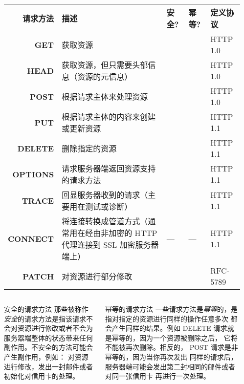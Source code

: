\documentclass[final,table]{beamer}
\newcommand{\yes}{\color{green!60!black}{yes}}
\newcommand{\no}{\color{red}{no}}
\newcommand{\method}[1]{\textbf{#1}}
\begin{document}
\begin{frame}{}
    \begin{columns}
      \begin{column}{0.05\textwidth}
      \end{column}
      \begin{column}{0.9\textwidth}
        \begin{block}{}
          \Huge
          \begin{tabular}{r p{} l l l}
            请求方法 & 描述 & 安全? & 幂等? & 定义协议\\ \hline
            \method{GET} & 获取资源 & \yes & \yes & HTTP 1.0 \\
            \method{HEAD} & 获取资源，但只需要头部信息（资源的元信息） & \yes & \yes &HTTP 1.0 \\
            \method{POST} & 根据请求主体来处理资源 & \no & \no & HTTP 1.0 \\
            \method{PUT} & 根据请求主体的内容来创建或更新资源 & \no & \yes & HTTP 1.1 \\
            \method{DELETE} & 删除指定的资源 & \yes & \yes & HTTP 1.1 \\
            \method{OPTIONS} & 请求服务器端返回资源支持的请求方法 & \yes & \yes & HTTP 1.1 \\
            \method{TRACE} & 回显服务器收到的请求（主要用在测试或诊断） & \yes & \yes & HTTP 1.1 \\
            \method{CONNECT} & 将连接转换成管道方式（通常用在经由非加密的 HTTP 代理连接到 SSL 加密服务器端上） & --- & --- & HTTP 1.1 \\
            \method{PATCH} & 对资源进行部分修改 & \no & \yes & RFC-5789 \\
          \end{tabular}
        \end{block}

        \vspace{0.5in}

        \begin{columns}
          \begin{column}{0.3\textwidth}
            \begin{block}{\huge{安全的请求方法}}
              \Large
              那些被称作\emph{安全}的请求方法是指该请求不会对资源进行修改或者不会为
              服务器端整体的状态带来任何副作用。不安全的方法可能会产生副作用，例如：
              对资源进行修改，发出一封邮件或者初始化对信用卡的处理。
            \end{block}
          \end{column}
          \begin{column}{0.62\textwidth}
            \begin{block}{\huge{幂等的请求方法}}
              \Large
              一些请求方法是\emph{幂等}的，是指对指定的资源进行同样的操作任意多次
              都会产生同样的结果。例如 DELETE 请求就是幂等的，因为一个资源被删除之后，
              它将不能被再次删除。相反的， POST 请求是非幂等的，因为当你再次发出
              同样的请求后，服务器端可能会发出第二封相同的邮件或者对同一张信用卡
              再进行一次处理。


\end{block}
\end{column}
\end{columns}
\end{column}
\end{columns}
\end{frame}
\end{document}
